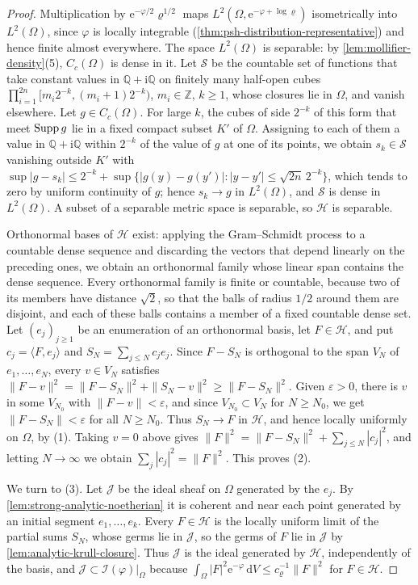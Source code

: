 \begin{proof}
Multiplication by $\mathrm e^{-\varphi/2}\varrho^{1/2}$ maps $L^2(\Omega,\mathrm e^{-\varphi+\log\varrho})$ isometrically into $L^2(\Omega)$, since $\varphi$ is locally integrable (\cref{thm:psh-distribution-representative}) and hence finite almost everywhere. The space $L^2(\Omega)$ is separable: by \cref{lem:mollifier-density}(5), $C_c(\Omega)$ is dense in it. Let $\mathcal S$ be the countable set of functions that take constant values in $\mathbb Q+\mathrm i\mathbb Q$ on finitely many half-open cubes $\prod_{i=1}^{2n}[m_i2^{-k},(m_i+1)2^{-k})$, $m_i\in\mathbb Z$, $k\geq1$, whose closures lie in $\Omega$, and vanish elsewhere. Let $g\in C_c(\Omega)$. For large $k$, the cubes of side $2^{-k}$ of this form that meet $\operatorname{Supp} g$ lie in a fixed compact subset $K'$ of $\Omega$. Assigning to each of them a value in $\mathbb Q+\mathrm i\mathbb Q$ within $2^{-k}$ of the value of $g$ at one of its points, we obtain $s_k\in\mathcal S$ vanishing outside $K'$ with $\sup|g-s_k|\leq2^{-k}+\sup\{|g(y)-g(y')|:|y-y'|\leq\sqrt{2n}\,2^{-k}\}$, which tends to zero by uniform continuity of $g$; hence $s_k\to g$ in $L^2(\Omega)$, and $\mathcal S$ is dense in $L^2(\Omega)$. A subset of a separable metric space is separable, so $\mathcal H$ is separable.

Orthonormal bases of $\mathcal H$ exist: applying the Gram--Schmidt process to a countable dense sequence and discarding the vectors that depend linearly on the preceding ones, we obtain an orthonormal family whose linear span contains the dense sequence. Every orthonormal family is finite or countable, because two of its members have distance $\sqrt2$, so that the balls of radius $1/2$ around them are disjoint, and each of these balls contains a member of a fixed countable dense set. Let $(e_j)_{j\geq1}$ be an enumeration of an orthonormal basis, let $F\in\mathcal H$, and put $c_j=\langle F,e_j\rangle$ and $S_N=\sum_{j\leq N}c_je_j$. Since $F-S_N$ is orthogonal to the span $V_N$ of $e_1,\ldots,e_N$, every $v\in V_N$ satisfies $\|F-v\|^2=\|F-S_N\|^2+\|S_N-v\|^2\geq\|F-S_N\|^2$. Given $\varepsilon>0$, there is $v$ in some $V_{N_0}$ with $\|F-v\|<\varepsilon$, and since $V_{N_0}\subset V_N$ for $N\geq N_0$, we get $\|F-S_N\|<\varepsilon$ for all $N\geq N_0$. Thus $S_N\to F$ in $\mathcal H$, and hence locally uniformly on $\Omega$, by (1). Taking $v=0$ above gives $\|F\|^2=\|F-S_N\|^2+\sum_{j\leq N}|c_j|^2$, and letting $N\to\infty$ we obtain $\sum_j|c_j|^2=\|F\|^2$. This proves (2).

We turn to (3). Let $\mathcal J$ be the ideal sheaf on $\Omega$ generated by the $e_j$. By \cref{lem:strong-analytic-noetherian} it is coherent and near each point generated by an initial segment $e_1,\ldots,e_k$. Every $F\in\mathcal H$ is the locally uniform limit of the partial sums $S_N$, whose germs lie in $\mathcal J$, so the germs of $F$ lie in $\mathcal J$ by \cref{lem:analytic-krull-closure}. Thus $\mathcal J$ is the ideal generated by $\mathcal H$, independently of the basis, and $\mathcal J\subset\mathcal I(\varphi)|_\Omega$ because $\int_\Omega|F|^2\mathrm e^{-\varphi}\,\mathrm dV\leq c_\varrho^{-1}\|F\|^2$ for $F\in\mathcal H$.


\end{proof}
